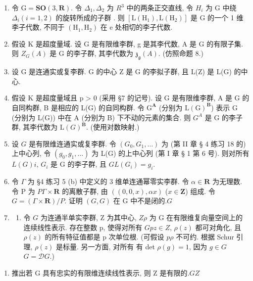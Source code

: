 \begin{enumerate}
\def\labelenumi{\arabic{enumi}.}
\item
  令 \(\mathrm{G} = \mathbf{SO}(3, \mathbf{R})\). 令 \(\Delta_{1}, \Delta_{2}\) 为 \(R^{3}\) 中的两条正交直线, 令 \(H_{i}\) 为 G 中绕 \(\Delta_{i} (i = 1, 2)\) 的旋转所成的子群 . 则 \([\mathrm{L}(\mathrm{H}_{1}), \mathrm{L}(\mathrm{H}_{2})]\) 是 G 的一个 1 维李子代数, 不同于 \((\mathrm{H}_{1}, \mathrm{H}_{2})\) 在 e 处相切的李子代数.
\item
  假设 K 是超度量域. 设 G 是有限维李群, g 是其李代数, A 是 G 的有限子集. 则 \(Z_{G}(A)\) 是 G 的李子群, 其李代数为 \(\mathfrak{z}_{\mathfrak{g}}(A)\). (仿照命题 8.)
\item
  设 G 是连通实或复李群. G 的中心 Z 是 G 的李拟子群, 且 L(Z) 是 L(G) 的中心.
\item
  假设 K 是超度量域且 p \textgreater{} 0 (采用 §7 的记号). 设 G 是有限维李群, A 是 G 的自同构群, B 是相应的 L(G) 的自同构群. 令 \(\mathrm{G}^{\mathbf{A}}\) (分别为 \(\mathrm{L}(\mathrm{G})^{\mathbf{B}}\)) 表示 G (分别为 L(G)) 中在 A (分别为 B) 下不动的元素的集合. 则 \(G^{A}\) 是 G 的李子群, 其李代数为 \(\mathrm{L}(G)^{\mathbf{B}}\). (使用对数映射.)
\item
  设 \(G\) 是有限维连通实或复李群. 令 \((G_0, G_1, \ldots)\) 为 (第 II 章 § 4 练习 18 的) 上中心列, 令 \((g_0, g_1, \ldots)\) 为 L(G) 的上中心列 (第 I 章 § 1 第 6 号). 则对所有 \(L(G)\)\(i\), \(G_i\) 是 G 的李子群, 且 \(G\)\(L(G_i) = g_i\).
\item
  令 \(\Gamma\) 为 §4 练习 5 (b) 中定义的 3 维单连通幂零实李群. 令 \(\alpha \in \mathbf{R}\) 为无理数. 令 P 为 \(P\)\(\Gamma \times \mathbf{R}\) 的离散子群, 由 \(((0,0,x),\alpha x)\) (\(x \in \mathbf{Z}\)) 组成. 令 \(G = (\Gamma \times \mathbf{R}) / P\). 证明 \((G,G)\) 在 G 中不是闭的.\(G\)
\item
  \begin{enumerate}
  \def\labelenumii{(\alph{enumii})}
  \tightlist
  \item
    令 \(G\) 为连通半单实李群, Z 为其中心, \(Z\)\(\rho\) 为 G 在有限维复向量空间上的连续线性表示. 存在整数 p, 使得对所有 \(G\)\(p\)\(z \in Z\), \(\rho(z)\) 都可对角化, 且 \(\rho(z)\) 的所有特征值都是 p 次单位根. (可假设 \(p\)\(\rho\) 不可约. 根据 Schur 引理, \(\rho(z)\) 是标量. 另一方面, 对所有  有 det \(\rho(g) = 1\), 因为 \(g \in G\)\(G = \mathcal{D}G\).)
  \end{enumerate}
\end{enumerate}

\begin{enumerate}
\def\labelenumi{(\alph{enumi})}
\setcounter{enumi}{1}
\tightlist
\item
  推出若 G 具有忠实的有限维连续线性表示, 则 Z 是有限的.\(G\)\(Z\)
\end{enumerate}


